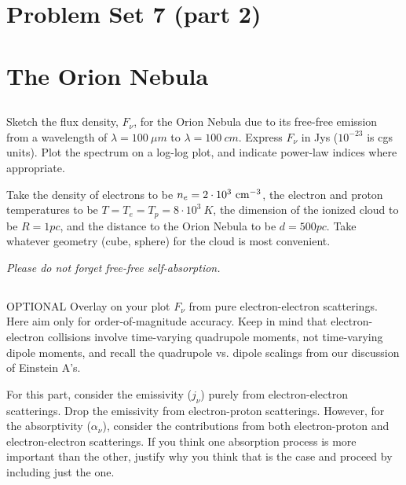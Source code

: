 \documentclass[11pt]{article}
\begin{document}
\section*{\centering Problem Set 7 (part 2)}

\section{The Orion Nebula}

\subsection{}

Sketch the flux density, $F_\nu$, for the Orion Nebula due to its free-free
emission from a wavelength of $\lambda=100~\mu m$ to $\lambda=100~cm$. Express $F_\nu$ in Jys
($10^{-23}$ is cgs units). Plot the spectrum on a log-log plot, and indicate
power-law indices where appropriate.  

Take the density of electrons to be 
$n_e=2\cdot10^3~{\rm cm}^{-3}$,
the electron and proton temperatures to be $T=T_e=T_p=8\cdot10^3~K$,
the dimension of the ionized cloud to be $R=1pc$, and the distance to the Orion
Nebula to be $d = 500 pc$. Take whatever geometry (cube, sphere) for the cloud is
most convenient.  

{\it Please do not forget free-free self-absorption.}

\subsection{} OPTIONAL 
Overlay on your plot $F_\nu$ from pure electron-electron
scatterings. Here aim only for order-of-magnitude accuracy. Keep in mind that
electron-electron collisions involve time-varying quadrupole moments, not
time-varying dipole moments, and recall the quadrupole vs. dipole scalings from
our discussion of Einstein A's.  

For this part, consider the emissivity ($j_\nu$)
purely from electron-electron scatterings. Drop the emissivity from
electron-proton scatterings. However, for the absorptivity ($\alpha_\nu$), consider the
contributions from both electron-proton and electron-electron scatterings. If
you think one absorption process is more important than the other, justify why
you think that is the case and proceed by including just the one.
\end{document}
